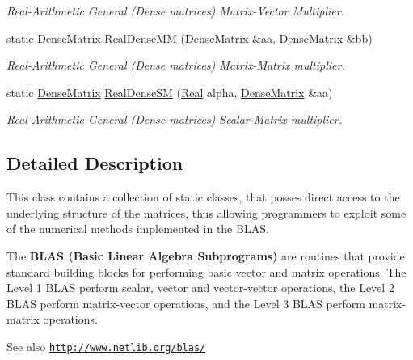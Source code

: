 \begin{DoxyCompactItemize}
\begin{DoxyCompactList}\small\item\em Real-\/\+Arithmetic General (Dense matrices) Matrix-\/\+Vector Multiplier. \end{DoxyCompactList}\item 
static \hyperlink{classmtk_1_1DenseMatrix}{Dense\+Matrix} \hyperlink{classmtk_1_1BLASAdapter_acebd0e9bfe0bdd609c7fbea98ccfd3b5}{Real\+Dense\+M\+M} (\hyperlink{classmtk_1_1DenseMatrix}{Dense\+Matrix} \&aa, \hyperlink{classmtk_1_1DenseMatrix}{Dense\+Matrix} \&bb)
\begin{DoxyCompactList}\small\item\em Real-\/\+Arithmetic General (Dense matrices) Matrix-\/\+Matrix multiplier. \end{DoxyCompactList}\item 
static \hyperlink{classmtk_1_1DenseMatrix}{Dense\+Matrix} \hyperlink{classmtk_1_1BLASAdapter_a0dd80d043615a95f11b7341ce69b44d3}{Real\+Dense\+S\+M} (\hyperlink{group__c01-roots_gac080bbbf5cbb5502c9f00405f894857d}{Real} alpha, \hyperlink{classmtk_1_1DenseMatrix}{Dense\+Matrix} \&aa)
\begin{DoxyCompactList}\small\item\em Real-\/\+Arithmetic General (Dense matrices) Scalar-\/\+Matrix multiplier. \end{DoxyCompactList}\end{DoxyCompactItemize}


\subsection{Detailed Description}
This class contains a collection of static classes, that posses direct access to the underlying structure of the matrices, thus allowing programmers to exploit some of the numerical methods implemented in the B\+L\+A\+S.

The {\bfseries B\+L\+A\+S (Basic Linear Algebra Subprograms)} are routines that provide standard building blocks for performing basic vector and matrix operations. The Level 1 B\+L\+A\+S perform scalar, vector and vector-\/vector operations, the Level 2 B\+L\+A\+S perform matrix-\/vector operations, and the Level 3 B\+L\+A\+S perform matrix-\/matrix operations.

\begin{DoxySeeAlso}{See also}
\href{http://www.netlib.org/blas/}{\tt http\+://www.\+netlib.\+org/blas/} 
\end{DoxySeeAlso}


